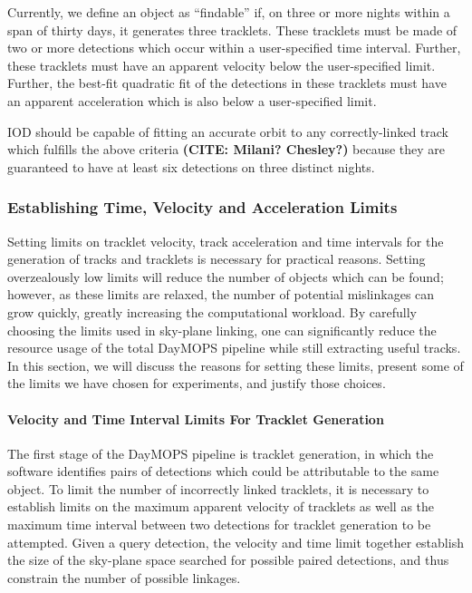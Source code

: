 \documentclass[12pt,preprint]{aastex}
\begin{document}
Currently, we define an object as ``findable'' if, on three or more
nights within a span of thirty days, it generates three
tracklets. These tracklets must be made of two or more detections
which occur within a user-specified time interval.  Further, these
tracklets must have an apparent velocity below the user-specified
limit. Further, the best-fit quadratic fit of the detections in these
tracklets must have an apparent acceleration which is also below a
user-specified limit.

IOD should be capable of fitting an accurate orbit to any
correctly-linked track which fulfills the above criteria
\textbf{(CITE: Milani? Chesley?)} because they are guaranteed to have
at least six detections on three distinct nights.  


\subsubsection{Establishing Time, Velocity and Acceleration Limits}

Setting limits on tracklet velocity, track acceleration and time
intervals for the generation of tracks and tracklets is necessary for
practical reasons.  Setting overzealously low limits will reduce the
number of objects which can be found; however, as these limits are
relaxed, the number of potential mislinkages can grow quickly, greatly
increasing the computational workload.  By carefully choosing the
limits used in sky-plane linking, one can significantly reduce the
resource usage of the total DayMOPS pipeline while still extracting
useful tracks.  In this section, we will discuss the reasons for
setting these limits, present some of the limits we have chosen for
experiments, and justify those choices.

\paragraph{Velocity and Time Interval Limits For Tracklet Generation}

The first stage of the DayMOPS pipeline is tracklet generation, in
which the software identifies pairs of detections which could be
attributable to the same object.  To limit the number of incorrectly
linked tracklets, it is necessary to establish limits on the maximum
apparent velocity of tracklets as well as the maximum time interval
between two detections for tracklet generation to be attempted.  Given
a query detection, the velocity and time limit together establish the
size of the sky-plane space searched for possible paired detections,
and thus constrain the number of possible linkages.
\end{document}
